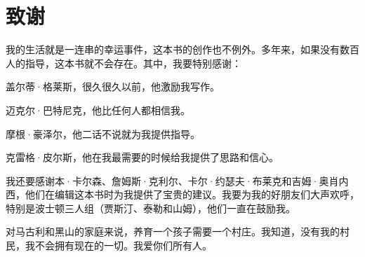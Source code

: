 \section{致谢}

我的生活就是一连串的幸运事件，这本书的创作也不例外。多年来，如果没有数百人的指导，这本书就不会存在。其中，我要特别感谢：

盖尔蒂·格莱斯，很久很久以前，他激励我写作。

迈克尔·巴特尼克，他比任何人都相信我。

摩根·豪泽尔，他二话不说就为我提供指导。

克雷格·皮尔斯，他在我最需要的时候给我提供了思路和信心。

我还要感谢本·卡尔森、詹姆斯·克利尔、卡尔·约瑟夫·布莱克和吉姆·奥肖内西，他们在编辑这本书时为我提供了宝贵的建议。我要为我的好朋友们大声欢呼，特别是波士顿三人组（贾斯汀、泰勒和山姆），他们一直在鼓励我。

对马古利和黑山的家庭来说，养育一个孩子需要一个村庄。我知道，没有我的村民，我不会拥有现在的一切。我爱你们所有人。

